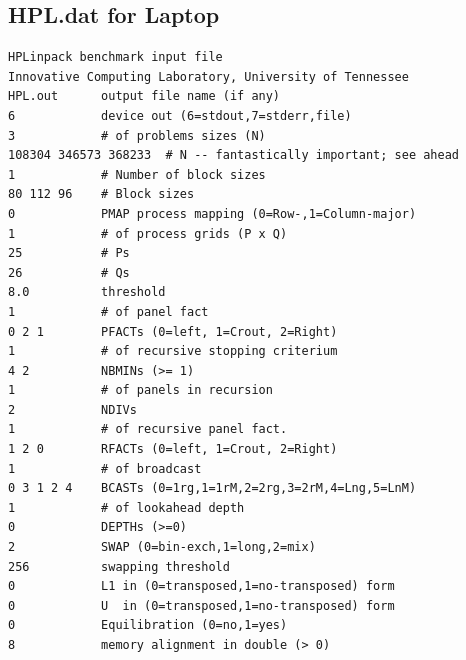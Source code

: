 \documentclass[10pt,twocolumn]{article}
\begin{document}
\begin{appendices}
\section{HPL.dat for Laptop}
\label{sec:appendixHPLdatLaptop}
\begin{lstlisting}
HPLinpack benchmark input file
Innovative Computing Laboratory, University of Tennessee
HPL.out      output file name (if any)
6            device out (6=stdout,7=stderr,file)
3            # of problems sizes (N)
108304 346573 368233  # N -- fantastically important; see ahead
1            # Number of block sizes
80 112 96    # Block sizes
0            PMAP process mapping (0=Row-,1=Column-major)
1            # of process grids (P x Q)
25           # Ps
26           # Qs
8.0          threshold
1            # of panel fact
0 2 1        PFACTs (0=left, 1=Crout, 2=Right)
1            # of recursive stopping criterium
4 2          NBMINs (>= 1)
1            # of panels in recursion
2            NDIVs
1            # of recursive panel fact.
1 2 0        RFACTs (0=left, 1=Crout, 2=Right)
1            # of broadcast
0 3 1 2 4    BCASTs (0=1rg,1=1rM,2=2rg,3=2rM,4=Lng,5=LnM)
1            # of lookahead depth
0            DEPTHs (>=0)
2            SWAP (0=bin-exch,1=long,2=mix)
256          swapping threshold
0            L1 in (0=transposed,1=no-transposed) form
0            U  in (0=transposed,1=no-transposed) form
0            Equilibration (0=no,1=yes)
8            memory alignment in double (> 0)
\end{lstlisting}

\end{appendices}
\end{document}
